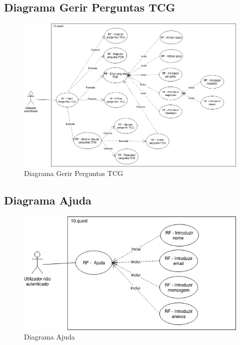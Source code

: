 \newpage


\subsection{Diagrama Gerir Perguntas TCG}
\label{d:perguntastcg}
\begin{figure}[ht!]
	\begin{center}
		\includegraphics[width=1\textwidth]{img/rf/gerir-perguntas-tcg}
		\caption{Diagrama Gerir Perguntas TCG}
		\label{fig:rf-gerir-perguntas-tcg}
	\end{center}
\end{figure}


\newpage

\subsection{Diagrama Ajuda}
\label{d:ajuda}
\begin{figure}[ht!]
	\begin{center}
		\includegraphics[width=1\textwidth]{img/rf/ajuda}
		\caption{Diagrama Ajuda}
		\label{fig:rf-ajuda}
	\end{center}
\end{figure}


